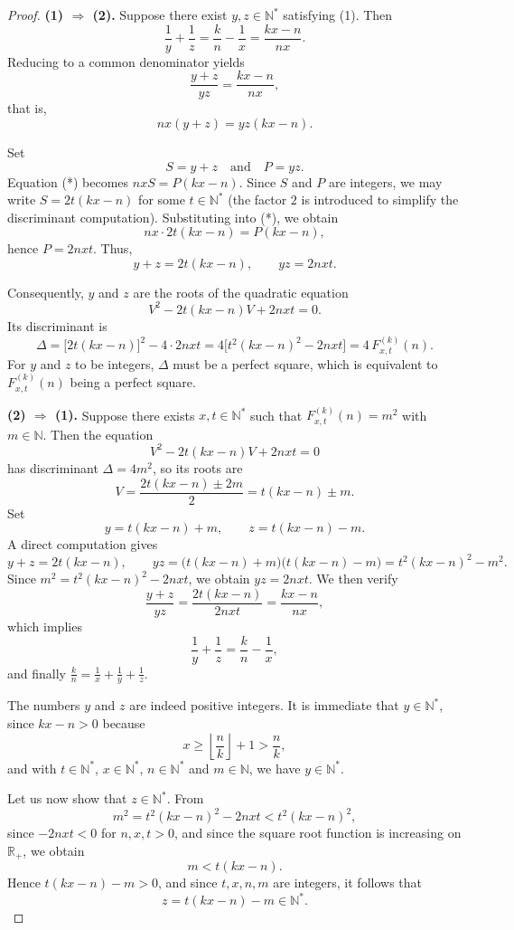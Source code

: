 \documentclass[12pt]{article}
\begin{document}
\begin{proof}
\textbf{(1) $\Rightarrow$ (2).} 
Suppose there exist \(y,z \in \mathbb{N}^*\) satisfying (1). Then
\[
\frac{1}{y} + \frac{1}{z} = \frac{k}{n} - \frac{1}{x} = \frac{kx - n}{nx}.
\]
Reducing to a common denominator yields
\[
\frac{y + z}{yz} = \frac{kx - n}{nx},
\]
that is,
\begin{equation}
nx(y + z) = yz(kx - n). \tag{*}
\end{equation}

Set 
\[
S = y + z \quad \text{and} \quad P = yz.
\]
Equation (*) becomes \(nxS = P(kx - n)\). 
Since \(S\) and \(P\) are integers, we may write \(S = 2t(kx - n)\) 
for some \(t \in \mathbb{N}^*\) (the factor \(2\) is introduced to simplify the discriminant computation). 
Substituting into (*), we obtain
\[
nx \cdot 2t(kx - n) = P(kx - n),
\]
hence \(P = 2nxt\). Thus,
\[
y + z = 2t(kx - n), \qquad yz = 2nxt.
\]

Consequently, \(y\) and \(z\) are the roots of the quadratic equation
\[
V^2 - 2t(kx - n)V + 2nxt = 0.
\]
Its discriminant is
\[
\Delta = \bigl[2t(kx - n)\bigr]^2 - 4 \cdot 2nxt 
= 4\bigl[t^2(kx - n)^2 - 2nxt\bigr] 
= 4\,F_{x,t}^{(k)}(n).
\]
For \(y\) and \(z\) to be integers, \(\Delta\) must be a perfect square, 
which is equivalent to \(F_{x,t}^{(k)}(n)\) being a perfect square.

\textbf{(2) $\Rightarrow$ (1).} 
Suppose there exists \( x,t \in \mathbb{N}^*\) such that \(F_{x,t}^{(k)}(n) = m^2\) 
with \(m \in \mathbb{N}\). Then the equation
\[
V^2 - 2t(kx - n)V + 2nxt = 0
\]
has discriminant \(\Delta = 4m^2\), so its roots are
\[
V = \frac{2t(kx - n) \pm 2m}{2} = t(kx - n) \pm m.
\]
Set
\[
y = t(kx - n) + m, \qquad z = t(kx - n) - m.
\]
A direct computation gives
\[
y + z = 2t(kx - n), \qquad 
yz = \bigl(t(kx - n) + m\bigr)\bigl(t(kx - n) - m\bigr) 
= t^2(kx - n)^2 - m^2.
\]
Since \(m^2 = t^2(kx - n)^2 - 2nxt\), we obtain \(yz = 2nxt\).
We then verify
\[
\frac{y + z}{yz} = \frac{2t(kx - n)}{2nxt} = \frac{kx - n}{nx},
\]
which implies
\[
\frac{1}{y} + \frac{1}{z} = \frac{k}{n} - \frac{1}{x},
\]
and finally \(\displaystyle \frac{k}{n} = \frac{1}{x} + \frac{1}{y} + \frac{1}{z}\).

The numbers \(y\) and \(z\) are indeed positive integers. It is immediate that \(y \in \mathbb{N}^*\), since \(kx - n > 0\) because
\[
x \ge \left\lfloor \frac{n}{k} \right\rfloor + 1 > \frac{n}{k}, 
\]
and with \(t \in \mathbb{N}^*\), \(x \in \mathbb{N}^*\), \(n \in \mathbb{N}^*\) and \(m \in \mathbb{N}\), we have \(y \in \mathbb{N}^*\).

Let us now show that \(z \in \mathbb{N}^*\). From
\[
m^2 = t^2(kx - n)^2 - 2nxt < t^2(kx - n)^2,
\]
since \(-2nxt < 0\) for \(n,x,t > 0\), and since the square root function is increasing on \(\mathbb{R}_+\), we obtain
\[
m < t(kx - n).
\]
Hence \(t(kx - n) - m > 0\), and since \(t,x,n,m\) are integers, it follows that
\[
z = t(kx - n) - m \in \mathbb{N}^*.
\]
\end{proof}
\end{document}
